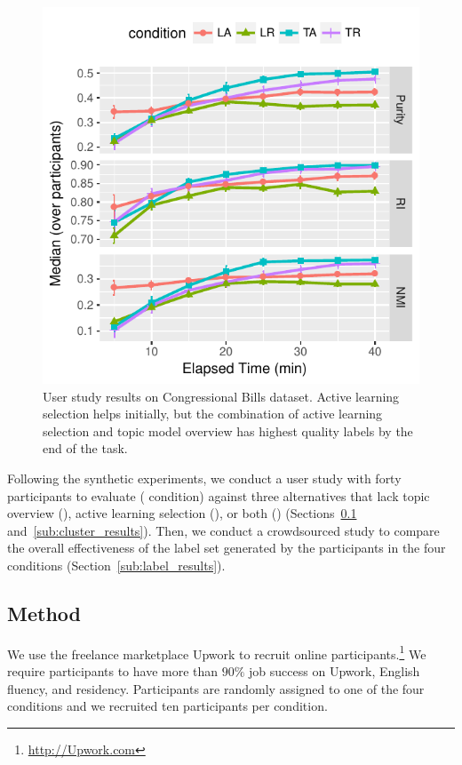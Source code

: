 \begin{figure}[t!]
\includegraphics[width=\linewidth]{2016_acl_doclabel/auto_fig/user_exp_plot}
\caption{User study results on  Congressional Bills dataset. Active learning selection helps initially, but the combination of active learning selection and topic model overview has highest quality labels by the end of the task.}
\label{fig:results}
\end{figure}

Following the synthetic experiments, we conduct a user study with
forty participants to evaluate \name{} ( condition) against
three alternatives that lack topic overview (), active
learning selection (), or both () (Sections~\ref{sub:procedures} and~\ref{sub:cluster_results}). Then, we conduct a crowdsourced study to compare the overall effectiveness of the label set generated by the participants in the four conditions (Section~\ref{sub:label_results}).

\subsection{Method}
\label{sub:procedures}

We use the freelance marketplace Upwork to recruit online
participants.\footnote{
\let\hyper@linkurl\saved@hyper@linkurl
\url{http://Upwork.com}\NoHyper} We require participants to have
more than $90\%$ job success on Upwork, English fluency, and 
residency. Participants are randomly assigned to one of the four conditions and
we recruited ten participants per condition.

